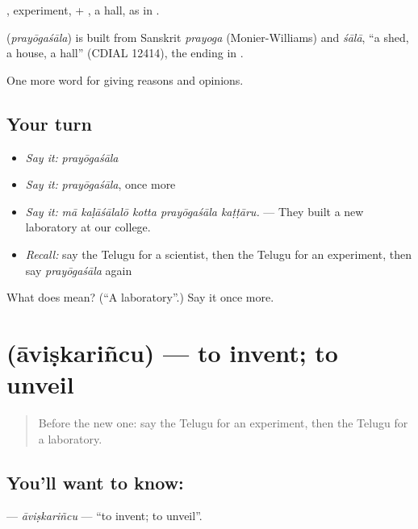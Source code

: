 , experiment, + , a hall, as in .

\begin{cousinweb}
\textbf{} (\emph{prayōgaśāla}) is built from Sanskrit \emph{prayoga} (Monier-Williams) and \emph{śālā}, \textquotedblleft{}a shed, a house, a hall\textquotedblright{} (CDIAL 12414), the ending in .
\end{cousinweb}

\begin{grammarlens}[title={What you've built}]
One more word for giving reasons and opinions.
\end{grammarlens}

\subsection*{Your turn}
\begin{itemize}
\raggedright
  \item \emph{Say it:} \emph{prayōgaśāla}
  \item \emph{Say it:} \emph{prayōgaśāla}, once more
  \item \emph{Say it:} \emph{mā kaḷāśālalō kotta prayōgaśāla kaṭṭāru.} — They built a new laboratory at our college.
  \item \emph{Recall:} say the Telugu for a scientist, then the Telugu for an experiment, then say \emph{prayōgaśāla} again
\end{itemize}

\begin{tcolorbox}[breakable,colback=teal!4,colframe=teal!35!black,title={Before you move on}]
What does  mean? (\textquotedblleft{}A laboratory\textquotedblright{}.) Say it once more.
\end{tcolorbox}
\section[\texorpdfstring{\te{ఆవిష్కరించు} (āviṣkariñcu)}{ఆవిష్కరించు (āviṣkariñcu)}]{ (āviṣkariñcu) — to invent; to unveil}

\label{lesson:TE-C413-aviskarincu}



\begin{quote}
Before the new one: say the Telugu for an experiment, then the Telugu for a laboratory.
\end{quote}

\subsection*{You'll want to know: }
\textbf{} — \emph{āviṣkariñcu} — \textquotedblleft{}to invent; to unveil\textquotedblright{}.

